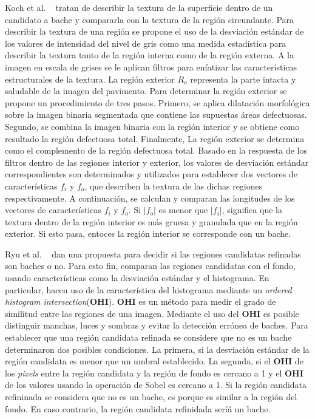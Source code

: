 Koch et al. ~ tratan de describir la textura de la superficie dentro de un candidato a bache y compararla con la textura de la 
región circundante. Para describir la textura de una región se propone el uso de la desviación estándar de los valores de intensidad del nivel 
de gris como una medida estadística para describir la textura  tanto de la región interna como de la región externa. A la imagen en escala de 
grises se le aplican filtros para enfatizar las características estructurales de la textura. La región exterior $R_o$ representa la parte intacta y 
saludable de la imagen del pavimento. Para determinar la región exterior se propone un  procedimiento de tres pasos. Primero, 
se aplica dilatación morfológica sobre la imagen binaria segmentada que contiene las supuestas áreas defectuosas. Segundo, 
se combina la imagen binaria con la región interior y se obtiene como resultado la región defectuosa total. Finalmente, 
La región exterior se determina como el complemento de la región defectuosa total. Basado en la respuesta de los filtros dentro de las regiones 
interior y exterior, los valores de desviación estándar correspondientes son determinados y utilizados para establecer dos vectores de características 
$f_i$ y $f_o$, que describen la textura de las dichas regiones respectivamente. A continuación, se calculan y comparan las longitudes de los vectores de 
características $f_i$ y $f_o$. Si $|f_o|$  es menor que  $|f_i|$, significa que la textura dentro de la región interior es más gruesa y granulada que en 
la región exterior. Si esto pasa, entoces la región interior se corresponde con un bache.


Ryu et al. ~ dan una propuesta para decidir si las regiones candidatas refinadas son baches o no. Para esto fin, 
comparan las regiones candidatas con el fondo, usando características como la desviación estándar y el histograma. En particular, hacen 
uso de la característica del histograma mediante un \emph{ordered histogram intersection}(\textbf{OHI}). \textbf{OHI} es un método para 
medir el grado de similitud entre las regiones de una imagen. Mediante el uso del \textbf{OHI} es posible distinguir manchas, luces y 
sombras y evitar la detección errónea de baches. Para establecer que una región candidata refinada se considere que no es un bache 
determinaron dos posibles condiciones. La primera, si la desviación estándar de la región candidata es menor que un umbral establecido.
La segunda, si el \textbf{OHI} de los \emph{pixels} entre la región candidata y la región de fondo   es cercano a 1 y el \textbf{OHI}
de los valores usando la operación de Sobel es cercano a 1. Si la región candidata refininada se considera que no es un bache,
es porque es similar a la región del fondo. En caso contrario, la región candidata refinidada seríá un bache.



